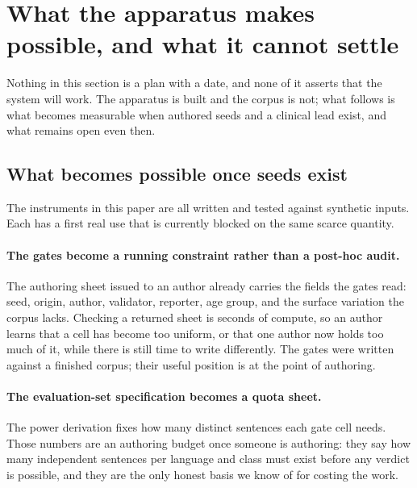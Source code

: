 %

\section{What the apparatus makes possible, and what it cannot settle}
\label{sec:future_work}

Nothing in this section is a plan with a date, and none of it asserts that the
system will work. The apparatus is built and the corpus is not; what follows is
what becomes measurable when authored seeds and a clinical lead exist, and what
remains open even then.

\subsection{What becomes possible once seeds exist}

The instruments in this paper are all written and tested against synthetic
inputs. Each has a first real use that is currently blocked on the same scarce
quantity.

\paragraph{The gates become a running constraint rather than a post-hoc audit.}
The authoring sheet issued to an author already carries the fields the gates
read: seed, origin, author, validator, reporter, age group, and the surface
variation the corpus lacks. Checking a returned sheet is seconds of compute, so
an author learns that a cell has become too uniform, or that one author now holds
too much of it, while there is still time to write differently. The gates were
written against a finished corpus; their useful position is at the point of
authoring.

\paragraph{The evaluation-set specification becomes a quota sheet.} The power
derivation fixes how many distinct sentences each gate cell needs. Those numbers
are an authoring budget once someone is authoring: they say how many independent
sentences per language and class must exist before any verdict is possible, and
they are the only honest basis we know of for costing the work.

